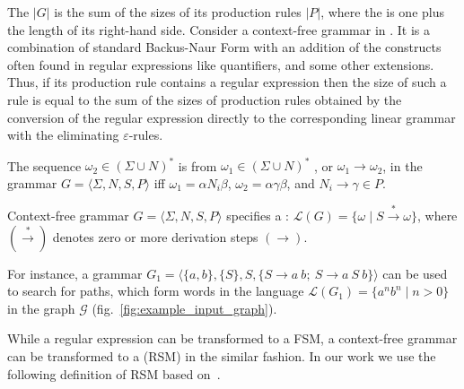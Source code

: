 The  $|G|$ is the sum of the sizes of its production rules $|P|$, where the  is one plus the length of its right-hand side. Consider a context-free grammar in . It is a combination of standard Backus-Naur Form with an addition of the constructs often found in regular expressions like quantifiers, and some other extensions. Thus, if its production rule contains a regular expression then the size of such a rule is equal to the sum of the sizes of production rules obtained by the conversion of the regular expression directly to the corresponding linear grammar with the eliminating $\varepsilon$-rules.

\begin{definition}
The sequence $\omega_2 \in (\Sigma \cup N)^*$ is  from $\omega_1 \in (\Sigma \cup N)^*$ , or $\omega_1 \to \omega_2$, in the grammar $G = \langle\Sigma, N, S, P\rangle$ iff $\omega_1=\alpha N_i \beta$, $\omega_2 = \alpha \gamma \beta$, and $N_i \to \gamma \in P$.
\end{definition}

\begin{definition}
Context-free grammar $G=\langle\Sigma, N, S, P\rangle$ specifies a : $\mathcal{L}(G) = \{\omega \mid S \xrightarrow{*} \omega \}$, where $(\xrightarrow{*})$ denotes zero or more derivation steps $(\to)$.
\end{definition}

For instance, a grammar $G_1 = \langle \{a,b\}, \{S\}, S, \{S \to a \ b; \ S \to a \ S \ b\} \rangle$ can be used to search for paths, which form words in the language $\mathcal{L}(G_1) = \{a^n b^n \mid n > 0\}$ in the graph $\mathcal{G}$ (fig.~\ref{fig:example_input_graph}).


While a regular expression can be transformed to a FSM, a context-free grammar can be transformed to a  (RSM) in the similar fashion.
In our work we use the following definition of RSM based
on~\cite{rsm:analysis:10.1007/3-540-44585-4_18}.

